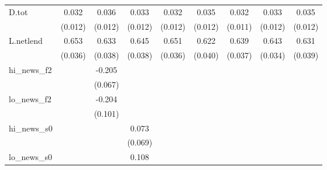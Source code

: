 {\begin{tabular}{l*{8}{c}}
D.tot       &       0.032\sym{***}&       0.036\sym{***}&       0.033\sym{***}&       0.032\sym{***}&       0.035\sym{***}&       0.032\sym{***}&       0.033\sym{***}&       0.035\sym{***}\\
            &     (0.012)         &     (0.012)         &     (0.012)         &     (0.012)         &     (0.012)         &     (0.011)         &     (0.012)         &     (0.012)         \\
\addlinespace
L.netlend   &       0.653\sym{***}&       0.633\sym{***}&       0.645\sym{***}&       0.651\sym{***}&       0.622\sym{***}&       0.639\sym{***}&       0.643\sym{***}&       0.631\sym{***}\\
            &     (0.036)         &     (0.038)         &     (0.038)         &     (0.036)         &     (0.040)         &     (0.037)         &     (0.034)         &     (0.039)         \\
\addlinespace
hi\_news\_f2  &                     &      -0.205\sym{***}&                     &                     &                     &                     &                     &                     \\
            &                     &     (0.067)         &                     &                     &                     &                     &                     &                     \\
\addlinespace
lo\_news\_f2  &                     &      -0.204\sym{**} &                     &                     &                     &                     &                     &                     \\
            &                     &     (0.101)         &                     &                     &                     &                     &                     &                     \\
\addlinespace
hi\_news\_s0  &                     &                     &       0.073         &                     &                     &                     &                     &                     \\
            &                     &                     &     (0.069)         &                     &                     &                     &                     &                     \\
\addlinespace
lo\_news\_s0  &                     &                     &       0.108         &                     &                     &                     &                     &                     \\

\end{tabular}}
